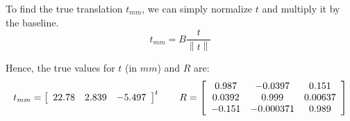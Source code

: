 To find the true translation $t_{mm}$, we can simply normalize $t$ and multiply it by the baseline.
\[t_{mm}=B\frac{t}{\left\|t\right\|}\]

Hence, the true values for $t$ (in $mm$) and $R$ are:
\[t_{mm}=\left[\begin{array}{c c c}
    22.78 & 2.839 & -5.497
\end{array}\right]^t\hspace*{2em}R=\left[\begin{array}{c c c}
    0.987 & -0.0397 & 0.151 \\
    0.0392 & 0.999 & 0.00637 \\
    -0.151 & -0.000371 & 0.989
\end{array}\right]\]
